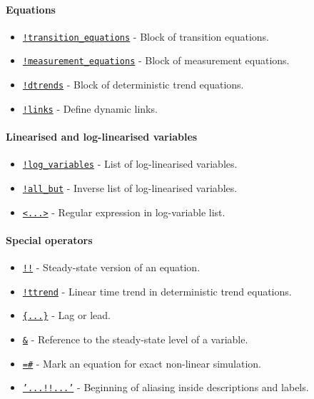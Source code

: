 \paragraph{Equations}\label{equations}

\begin{itemize}
\itemsep1pt\parskip0pt
\item
  \href{modellang/transitionequations}{\texttt{!transition\_equations}}
  - Block of transition equations.
\item
  \href{modellang/measurementequations}{\texttt{!measurement\_equations}}
  - Block of measurement equations.
\item
  \href{modellang/dtrends}{\texttt{!dtrends}} - Block of deterministic
  trend equations.
\item
  \href{modellang/links}{\texttt{!links}} - Define dynamic links.
\end{itemize}

\paragraph{Linearised and log-linearised
variables}\label{linearised-and-log-linearised-variables}

\begin{itemize}
\itemsep1pt\parskip0pt
\item
  \href{modellang/logvariables}{\texttt{!log\_variables}} - List of
  log-linearised variables.
\item
  \href{modellang/allbut}{\texttt{!all\_but}} - Inverse list of
  log-linearised variables.
\item
  \href{modellang/regexpression}{\texttt{\textless{}...\textgreater{}}}
  - Regular expression in log-variable list.
\end{itemize}

\paragraph{Special operators}\label{special-operators}

\begin{itemize}
\itemsep1pt\parskip0pt
\item
  \href{modellang/sstateversion}{\texttt{!!}} - Steady-state version of
  an equation.
\item
  \href{modellang/ttrend}{\texttt{!ttrend}} - Linear time trend in
  deterministic trend equations.
\item
  \href{modellang/laglead}{\texttt{\{...\}}} - Lag or lead.
\item
  \href{modellang/sstateref}{\texttt{\&}} - Reference to the
  steady-state level of a variable.
\item
  \href{modellang/exactnonlin}{\texttt{=\#}} - Mark an equation for
  exact non-linear simulation.
\item
  \href{modellang/alias}{\texttt{'...!!...'}} - Beginning of aliasing
  inside descriptions and labels.
\end{itemize}

